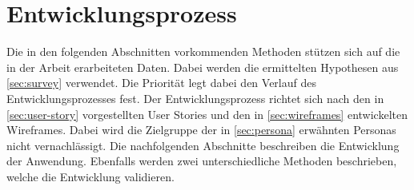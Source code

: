 \section{Entwicklungsprozess}\label{sec:entwicklungsprozess}
Die in den folgenden Abschnitten vorkommenden Methoden stützen sich auf die in der Arbeit erarbeiteten Daten.
Dabei werden die ermittelten Hypothesen aus \autoref{sec:survey} verwendet.
Die Priorität legt dabei den Verlauf des Entwicklungsprozesses fest.
Der Entwicklungsprozess richtet sich nach den in \autoref{sec:user-story} vorgestellten User Stories und den in \autoref{sec:wireframes} entwickelten Wireframes.
Dabei wird die Zielgruppe der in \autoref{sec:persona} erwähnten Personas nicht vernachlässigt.
Die nachfolgenden Abschnitte beschreiben die Entwicklung der Anwendung.
Ebenfalls werden zwei unterschiedliche Methoden beschrieben, welche die Entwicklung validieren.
